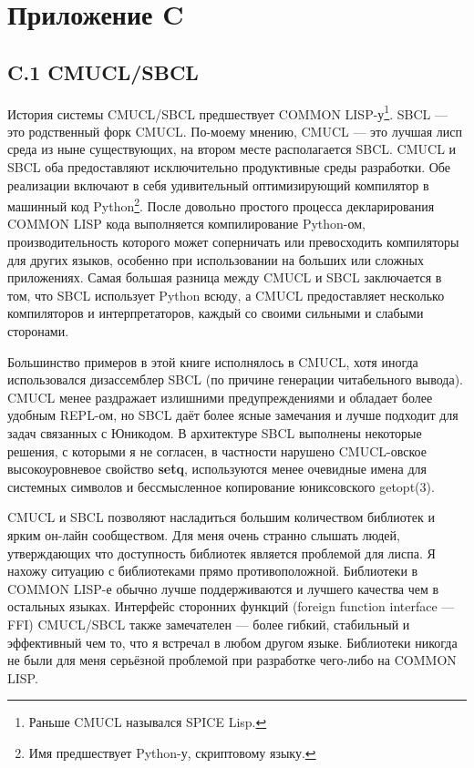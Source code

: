 \chapter*{Приложение C}

\section*{C.1 CMUCL/SBCL}

История системы CMUCL/SBCL предшествует COMMON LISP-у\footnote[1]{Раньше CMUCL назывался SPICE Lisp.}. SBCL --- это родственный форк CMUCL. По-моему мнению, CMUCL --- это лучшая лисп среда из ныне существующих, на втором месте располагается SBCL. CMUCL и SBCL оба предоставляют исключительно продуктивные среды разработки. Обе реализации включают в себя удивительный оптимизирующий компилятор в машинный код Python\footnote[2]{Имя предшествует Python-у, скриптовому языку.}. После довольно простого процесса декларирования COMMON LISP кода выполняется компилирование Python-ом, производительность которого может соперничать или превосходить компиляторы для других языков, особенно при использовании на больших или сложных приложениях. Самая большая разница между CMUCL и SBCL заключается в том, что SBCL использует Python всюду, а CMUCL предоставляет несколько компиляторов и интерпретаторов, каждый со своими сильными и слабыми сторонами.

Большинство примеров в этой книге исполнялось в CMUCL, хотя иногда использовался дизассемблер SBCL (по причине генерации читабельного вывода). CMUCL менее раздражает излишними предупреждениями и обладает более удобным REPL-ом, но SBCL даёт более ясные замечания и лучше подходит для задач связанных с Юникодом. В архитектуре SBCL выполнены некоторые решения, с которыми я не согласен, в частности нарушено CMUCL-овское высокоуровневое свойство \textbf{setq}, используются менее очевидные имена для системных символов и бессмысленное копирование юниксовского getopt(3).

CMUCL и SBCL позволяют насладиться большим количеством библиотек и ярким он-лайн сообществом. Для меня очень странно слышать людей, утверждающих что доступность библиотек является проблемой для лиспа. Я нахожу ситуацию с библиотеками прямо противоположной. Библиотеки в COMMON LISP-е обычно лучше поддерживаются и лучшего качества чем в остальных языках. Интерфейс сторонних функций (foreign function interface --- FFI) CMUCL/SBCL также замечателен --- более гибкий, стабильный и эффективный чем то, что я встречал в любом другом языке. Библиотеки никогда не были для меня серьёзной проблемой при разработке чего-либо на COMMON LISP.

